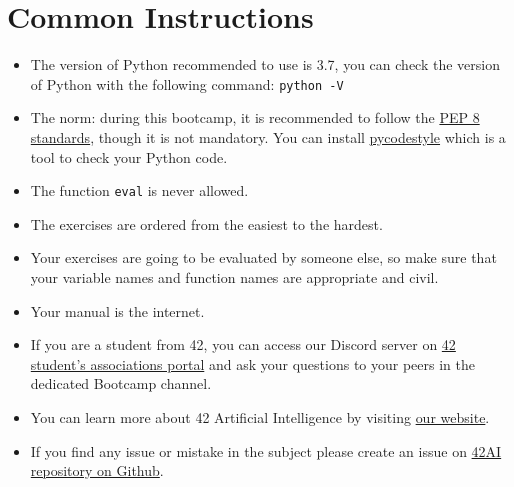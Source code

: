 
\chapter{Common Instructions}
\begin{itemize}
  \item The version of Python recommended to use is 3.7, you can
  check the version of Python with the following command: \texttt{python -V}
  
  \item The norm: during this bootcamp, it is recommended to follow the
  \href{https://www.python.org/dev/peps/pep-0008/}{PEP 8 standards}, though it is not mandatory.
  You can install \href{https://pypi.org/project/pycodestyle}{pycodestyle} which
  is a tool to check your Python code.
  \item The function \texttt{eval} is never allowed.
  \item The exercises are ordered from the easiest to the hardest.
  \item Your exercises are going to be evaluated by someone else,
  so make sure that your variable names and function names are appropriate and civil.
  \item Your manual is the internet.
  
  \item If you are a student from 42, you can access our Discord server 
  on \href{https://discord.com/channels/887850395697807362/887850396314398720}{42 student's associations portal} and ask your
  questions to your peers in the dedicated Bootcamp channel. 

  \item You can learn more about 42 Artificial Intelligence by visiting \href{https://42-ai.github.io}{our website}.

  \item If you find any issue or mistake in the subject please create an issue on \href{https://github.com/42-AI/bootcamp_python/issues}{42AI repository on Github}.
  

\end{itemize}
